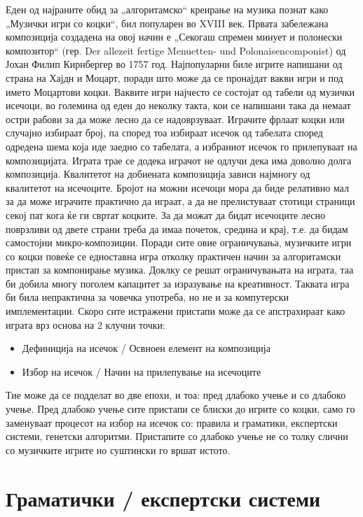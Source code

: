 Еден од најраните обид за „алгоритамско“ креирање на музика познат како „Музички игри со коцки“, бил популарен во XVIII век. Првата забележана композиција создадена на овој начин е „Секогаш спремен минует и полонески композитор“ (гер. Der allezeit fertige Menuetten- und Polonaisencomponist) од Јохан Филип Кирнбергер во 1757 год. Најпопуларни биле игрите напишани од страна на Хајдн и Моцарт, поради што може да се пронајдат вакви игри и под името Моцартови коцки. Ваквите игри најчесто се состојат од табели од музички исечоци, во големина од еден до неколку такта, кои се напишани така да немаат остри рабови за да може лесно да се надоврзуваат. Играчите фрлаат коцки или случајно избираат број, па според тоа избираат исечок од табелата според одредена шема која иде заедно со табелата, а избраниот исечок го прилепуваат на композицијата. Играта трае се додека играчот не одлучи дека има доволно долга композиција. Квалитетот на добиената композиција зависи најмногу од квалитетот на исечоците. Бројот на можни исечоци мора да биде релативно мал за да може играчите практично да играат, а да не прелистуваат стотици страници секој пат кога ќе ги свртат коцките. За да можат да бидат исечоците лесно поврзливи од двете страни треба да имаа почеток, средина и крај, т.е. да бидам самостојни микро-композиции. Поради сите овие ограничувања, музичките игри со коцки повеќе се едноставна игра отколку практичен начин за алгоритамски пристап за компонирање музика. Доклку се решат ограничувањата на играта, таа би добила многу поголем капацитет за изразување на креативност. Таквата игра би била непрактична за човечка употреба, но не и за компутерски имплементации. Скоро сите истражени пристапи може да се апстрахираат како играта врз основа на 2 клучни точки:
\begin{itemize}
    \item Дефиниција на исечок / Освноен елемент на композиција 
    \item Избор на исечок / Начин на прилепување на исечоците
\end{itemize}
Тие може да се подделат во две епохи, и тоа: пред длабоко учење и со длабоко учење. Пред длабоко учење сите пристапи се блиски до игрите со коцки, само го заменуваат процесот на избор на исечок со: правила и граматики, експертски системи, генетски алгоритми. Пристапите со длабоко учење не со толку слични со музичките игрите но суштински го вршат истото. 

\section{Граматички / експертски системи} 

